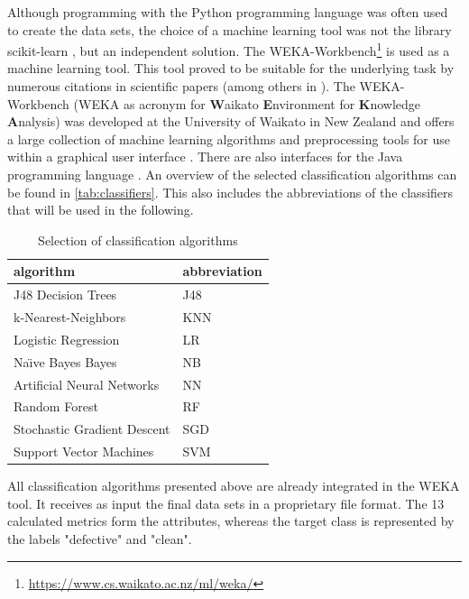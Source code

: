 Although programming with the Python programming language was often used to create the data sets, the choice of a machine learning tool was not the library scikit-learn \cite{scikit}, but an independent solution. The WEKA-Workbench\footnote{\href{https://www.cs.waikato.ac.nz/ml/weka/}{https://www.cs.waikato.ac.nz/ml/weka/}} is used as a machine learning tool. This tool proved to be suitable for the underlying task by numerous citations in scientific papers (among others in \cite{Hammouri2018,Queiroz2016,Ratzinger2008}). The WEKA-Workbench (WEKA as acronym for \textbf{W}aikato \textbf{E}nvironment for \textbf{K}nowledge \textbf{A}nalysis) was developed at the University of Waikato in New Zealand and offers a large collection of machine learning algorithms and preprocessing tools for use within a graphical user interface \cite{Weka2016}. There are also interfaces for the Java programming language \cite{Weka2016}. An overview of the selected classification algorithms can be found in \autoref{tab:classifiers}. This also includes the abbreviations of the classifiers that will be used in the following.

\begin{table}[t]
\centering
\caption{Selection of classification algorithms}
\label{tab:classifiers}
\begin{tabular}{@{}ll@{}}
\toprule
algorithm                                        & abbreviation \\ \midrule
J48 Decision Trees                               & J48          \\
k-Nearest-Neighbors                              & KNN          \\
Logistic Regression                              & LR           \\
Na\"{\i}ve Bayes Bayes & NB           \\
Artificial Neural Networks                       & NN           \\
Random Forest                                    & RF           \\
Stochastic Gradient Descent                      & SGD          \\
Support Vector Machines                          & SVM          \\ \bottomrule
\end{tabular}
\end{table}

All classification algorithms presented above are already integrated in the WEKA tool. It receives as input the final data sets in a proprietary file format. The 13 calculated metrics form the attributes, whereas the target class is represented by the labels "defective" and "clean".

